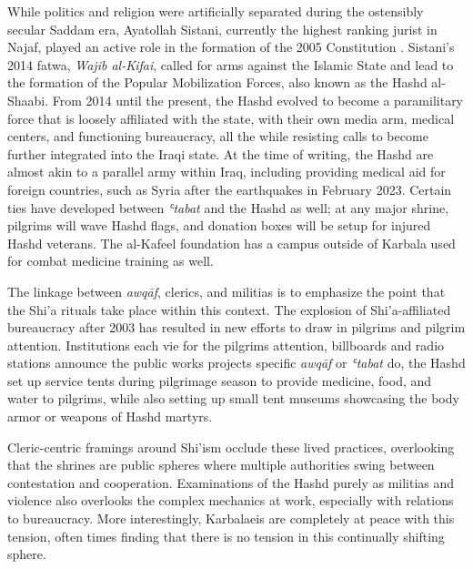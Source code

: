 
While politics and religion were artificially separated during the ostensibly secular Saddam era, Ayatollah Sistani, currently the highest ranking jurist in Najaf, played an active role in the formation of the 2005 Constitution \cite[146]{nakash_reaching_2006}. Sistani's 2014 fatwa, \emph{Wajib al-Kifai}, called for arms against the Islamic State and lead to the formation of the Popular Mobilization Forces, also known as the Hashd al-Shaabi. From 2014 until the present, the Hashd evolved to become a paramilitary force that is loosely affiliated with the state, with their own media arm, medical centers, and functioning bureaucracy, all the while resisting calls to become further integrated into the Iraqi state. At the time of writing, the Hashd are almost akin to a parallel army within Iraq, including providing medical aid for foreign countries, such as Syria after the earthquakes in February 2023. Certain ties have developed between \emph{ʿtabat} and the Hashd as well; at any major shrine, pilgrims will wave Hashd flags, and donation boxes will be setup for injured Hashd veterans. The al-Kafeel foundation has a campus outside of Karbala used for combat medicine training as well. 

The linkage between \emph{awqāf}, clerics, and militias is to emphasize the point that the Shi'a rituals take place within this context. The explosion of Shi'a-affiliated bureaucracy after 2003 has resulted in new efforts to draw in pilgrims and pilgrim attention. Institutions each vie for the pilgrims attention, billboards and radio stations announce the public works projects specific \emph{awqāf} or \emph{ʿtabat} do, the Hashd set up service tents during pilgrimage season to provide medicine, food, and water to pilgrims, while also setting up small tent museums showcasing the body armor or weapons of Hashd martyrs. 

Cleric-centric framings around Shi'ism occlude these lived practices, overlooking that the shrines are public spheres where multiple authorities swing between contestation and cooperation. Examinations of the Hashd purely as militias and violence also overlooks the complex mechanics at work, especially with relations to bureaucracy. More interestingly, Karbalaeis are completely at peace with this tension, often times finding that there is no tension in this continually shifting sphere.

